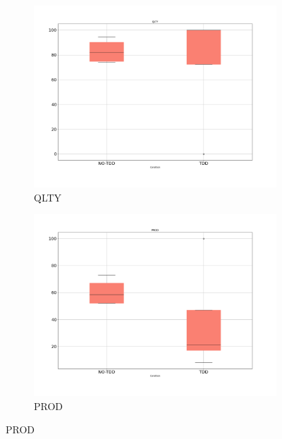 \begin{figure}[H]
    \centering
    \begin{subfigure}{0.5\textwidth}
        \includegraphics[width=\linewidth]{figures/box_plots/task2/QLTY.png}
        \caption{QLTY}
        \label{bp_task2_qlty}
    \end{subfigure}\hfil
    \begin{subfigure}{0.5\textwidth}
        \includegraphics[width=\linewidth]{figures/box_plots/task2/PROD.png}
        \caption{PROD}
        \label{bp_task2_prod}
    \end{subfigure}

    \medskip


\end{figure}
